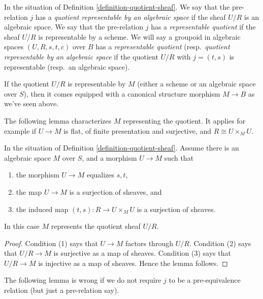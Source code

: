 \begin{definition}
\label{definition-representable-quotient}
In the situation of Definition \ref{definition-quotient-sheaf}.
We say that the pre-relation $j$ has a
{\it quotient representable by an algebraic space}
if the sheaf $U/R$ is an algebraic space.
We say that the pre-relation $j$ has a
{\it representable quotient}
if the sheaf $U/R$ is representable by a scheme.
We will say a groupoid in algebraic spaces $(U, R, s, t, c)$ over $B$ has a
{\it representable quotient}
(resp.\ {\it quotient representable by an algebraic space}
if the quotient $U/R$ with $j = (t, s)$ is representable (resp.\ an
algebraic space).
\end{definition}

\noindent
If the quotient $U/R$ is representable by $M$ (either a scheme or an algebraic
space over $S$), then it comes equipped with a canonical structure morphism
$M \to B$ as we've seen above.

\medskip\noindent
The following lemma characterizes $M$ representing the quotient.
It applies for example if $U \to M$ is flat,
of finite presentation and surjective, and $R \cong U \times_M U$.

\begin{lemma}
\label{lemma-criterion-quotient-representable}
In the situation of Definition \ref{definition-quotient-sheaf}.
Assume there is an algebraic space $M$ over $S$,
and a morphism $U \to M$ such that
\begin{enumerate}
\item the morphism $U \to M$ equalizes $s, t$,
\item the map $U \to M$ is a surjection of sheaves, and
\item the induced map $(t, s) : R \to U \times_M U$ is a
surjection of sheaves.
\end{enumerate}
In this case $M$ represents the quotient sheaf $U/R$.
\end{lemma}

\begin{proof}
Condition (1) says that $U \to M$ factors through $U/R$.
Condition (2) says that $U/R \to M$ is surjective as a map of sheaves.
Condition (3) says that $U/R \to M$ is injective as a map of sheaves.
Hence the lemma follows.
\end{proof}

\noindent
The following lemma is wrong if we do not require $j$ to be a
pre-equivalence relation (but just a pre-relation say).

